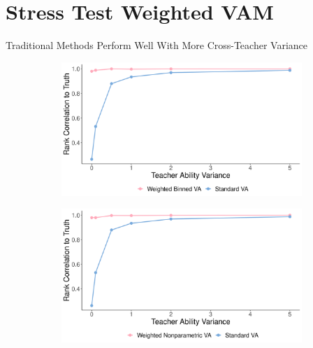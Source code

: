 \documentclass[t,aspectratio=169,11pt]{beamer}
\begin{document}
\section{Stress Test Weighted VAM}



\begin{frame}{Traditional Methods Perform Well With More Cross-Teacher Variance}
\vfill
\begin{figure}
\centering
\begin{subfigure}{.5\textwidth}
  \centering
  \includegraphics[width=\linewidth]{slides/CIERS_Figures/stress_bin_ta_sd.png}
\end{subfigure}%
\begin{subfigure}{.5\textwidth}
  \centering
  \includegraphics[width=\linewidth]{slides/CIERS_Figures/stress_np_ta_sd.png}
\end{subfigure}
\end{figure}

\end{frame}
\end{document}
